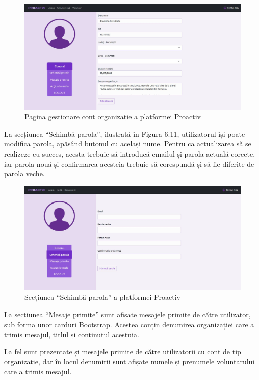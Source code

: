 \documentclass[12pt,a4paper]{report}
\begin{document}
\begin{figure}[H]
\centering
  \includegraphics[width=1\linewidth]{./imagini/cont1org.jpg}
  \caption{Pagina gestionare cont organizație a platformei Proactiv}
\end{figure}
\par
La secțiunea “Schimbă parola”, ilustrată în Figura 6.11, utilizatorul își poate modifica parola, apăsând butonul cu același nume. Pentru ca actualizarea să se realizeze cu succes, acesta trebuie să introducă emailul și parola actuală corecte, iar parola nouă și confirmarea acesteia trebuie să corespundă și să fie diferite de parola veche.
\\
\begin{figure}[H]
\centering
  \includegraphics[width=1\linewidth]{./imagini/cont2.jpg}
  \caption{Secțiunea “Schimbă parola” a platformei Proactiv}
\end{figure}
\newpage
La secțiunea “Mesaje primite” sunt afișate mesajele primite de către utilizator, sub forma unor carduri Bootstrap. Acestea conțin denumirea organizației care a trimis mesajul, titlul și conținutul acestuia.
\par
La fel sunt prezentate și mesajele primite de către utilizatorii cu cont de tip organizație, dar în locul denumirii sunt afișate numele și prenumele voluntarului care a trimis mesajul.
\end{document}
